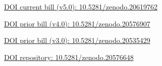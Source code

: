 \documentclass[11pt]{article}
\begin{document}
\href{https://doi.org/10.5281/zenodo.20619762}{DOI current bill (v5.0): 10.5281/zenodo.20619762}

\href{https://doi.org/10.5281/zenodo.20576907}{DOI prior bill (v4.0): 10.5281/zenodo.20576907}

\href{https://doi.org/10.5281/zenodo.20535429}{DOI prior bill (v3.0): 10.5281/zenodo.20535429}

\href{https://doi.org/10.5281/zenodo.20576648}{DOI repository: 10.5281/zenodo.20576648}


\clearpage
{}
{}
\vspace{-0.6cm}

\begingroup
\RaggedRight
\nocite{*}


\endgroup
\end{document}

